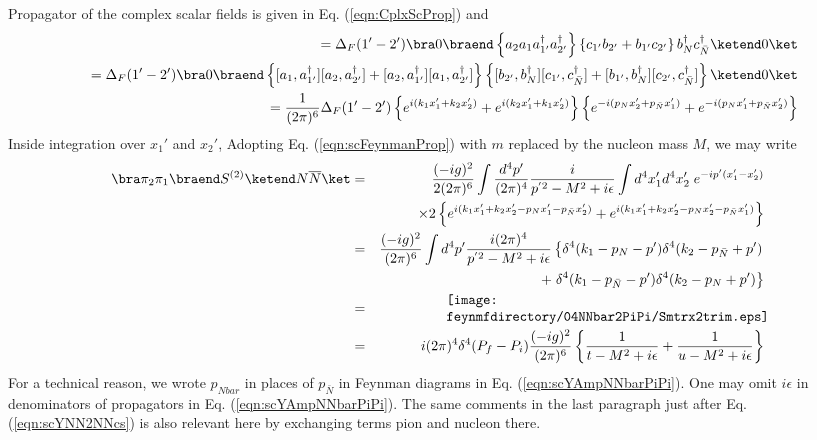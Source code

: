 Propagator of the complex scalar fields is given in Eq. (\ref{eqn:CplxScProp}) and
\begin{eqnarray}
&&
=
\Delta_F(1' - 2')
\bra 0 \braend
\left\{
 a_2 a_1 a_{1'}^\dagger a_{2'}^\dagger
\right\}
\left\{
c_{1'}b_{2'} + b_{1'}c_{2'} 
\right\}
b_{N}^\dagger c_{\bar{N}}^\dagger 
\ketend 0 \ket
\nonumber\\
&&
=
\Delta_F(1' - 2')
\bra 0 \braend
\left\{
[a_1, a_{1'}^\dagger] [a_2, a_{2'}^\dagger]
+
[a_2, a_{1'}^\dagger] [a_1, a_{2'}^\dagger]
\right\}
\left\{
[b_{2'}, b_{N}^\dagger]  [c_{1'},  c_{\bar{N}}^\dagger ]
+ [b_{1'}, b_{N}^\dagger]
[c_{2'} ,  c_{\bar{N}}^\dagger ]
\right\}
\ketend 0 \ket
\nonumber\\
&&
=
\frac{1}{(2\pi)^6} \Delta_F(1' - 2')
\left\{
e^{i(k_1 x_1' + k_2 x_2')}
+
e^{i(k_2 x_1' + k_1 x_2')}
\right\}
\left\{
e^{-i(p_N x_2' + p_{\bar{N}} x_1')}
+
e^{-i(p_N x_1' + p_{\bar{N}} x_2')}
\right\}
\nonumber\\
\end{eqnarray}
Inside integration over $x_1'$ and $x_2'$, 
Adopting Eq. (\ref{eqn:scFeynmanProp}) with $m$ replaced by the nucleon mass $M$, we may write
\begin{eqnarray}
\bra \pi_2 \pi_1  \braend
S^{(2)}
\ketend N \overline{N} \ket
&=&
\frac{(-ig)^2}{2 (2\pi)^6}
\int \frac{d^4 p'}{(2\pi)^4} \frac{i}{p^{'2} - M^2 + i\epsilon}
\int d^4 x_1' d^4 x_2'\; e^{-ip' (x_1' - x_2')}
\nonumber\\
&&
\times 2
\left\{
e^{i(k_1 x_1' + k_2 x_2' -p_N x_1' - p_{\bar{N}} x_2')}
+
e^{i(k_1 x_1' + k_2 x_2' -p_N x_2' - p_{\bar{N}} x_1')}
\right\}
\nonumber\\
&=&
\frac{(-ig)^2}{(2\pi)^6}
\int d^4 p'  \frac{i (2\pi)^4}{p^{'2} - M^2 + i\epsilon}
\left\{
\delta^4 (k_1  -p_N - p' ) \delta^4( k_2 - p_{\bar{N}} + p')
\right.
\nonumber\\
&&
\hspace{40mm}
+
\left.
\delta^4( k_1 - p_{\bar{N}} - p') \delta^4 (k_2  -p_N + p' ) 
\right\}
\nonumber\\
&=&
\parbox{80mm}{
\texttt{[image: \\feynmfdirectory/04NNbar2PiPi/Smtrx2trim.eps]}
}
\nonumber\\
&=&
i (2\pi)^4 \delta^4(P_f - P_i)
\frac{(-ig)^2}{(2\pi)^6}
\left\{
\frac{1}{t - M^2 + i\epsilon}
+
\frac{1}{u - M^2 + i\epsilon}
\right\}
\label{eqn:scYAmpNNbarPiPi}
\end{eqnarray}
For a technical reason, we wrote $p_{Nbar}$ in places of $p_{\bar{N}}$ in 
Feynman diagrams in Eq. (\ref{eqn:scYAmpNNbarPiPi}).
One may omit $i\epsilon$ in denominators of propagators in Eq.  (\ref{eqn:scYAmpNNbarPiPi}).
The same comments in the last paragraph just after Eq. (\ref{eqn:scYNN2NNcs}) is 
also relevant here by exchanging terms pion and nucleon there.

